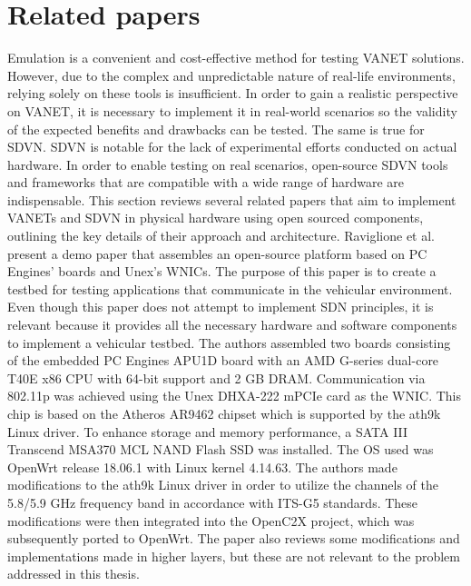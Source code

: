 \chapter{Related papers}
\label{cha:related_papers}

    Emulation is a convenient and cost-effective method for testing VANET solutions. However, due to the complex and unpredictable nature of real-life environments, relying solely on these tools is insufficient\cite{Cardona et al., 2020}. In order to gain a realistic perspective on VANET, it is necessary to implement it in real-world scenarios so the validity of the expected benefits and drawbacks can be tested. The same is true for SDVN. 
    SDVN is notable for the lack of experimental efforts conducted on actual hardware. In order to enable testing on real scenarios, open-source SDVN tools and frameworks that are compatible with a wide range of hardware are indispensable\cite{Cardona et al., 2020}. This section reviews several related papers that aim to implement VANETs and SDVN in physical hardware using open sourced components, outlining the key details of their approach and architecture. 
    \cite{Raviglione et al., 2019} 
    Raviglione et al. present a demo paper that assembles an open-source platform based on PC Engines' boards and Unex's WNICs. The purpose of this paper is to create a testbed for testing applications that communicate in the vehicular environment. Even though this paper does not attempt to implement SDN principles, it is relevant because it provides all the necessary hardware and software components to implement a vehicular testbed.
    The authors assembled two boards consisting of the embedded PC Engines APU1D board with an AMD G-series dual-core T40E x86 CPU with 64-bit support and 2 GB DRAM. Communication via 802.11p was achieved using the Unex DHXA-222 mPCIe card as the WNIC. This chip is based on the Atheros AR9462 chipset which is supported by the ath9k Linux driver. To enhance storage and memory performance, a SATA III Transcend MSA370 MCL NAND Flash SSD was installed.
    The OS used was OpenWrt release 18.06.1 with Linux kernel 4.14.63. The authors made modifications to the ath9k Linux driver in order to utilize the channels of the 5.8/5.9 GHz frequency band in accordance with ITS-G5 standards. These modifications were then integrated into the OpenC2X project, which was subsequently ported to OpenWrt. The paper also reviews some modifications and implementations made in higher layers, but these are not relevant to the problem addressed in this thesis.
    
